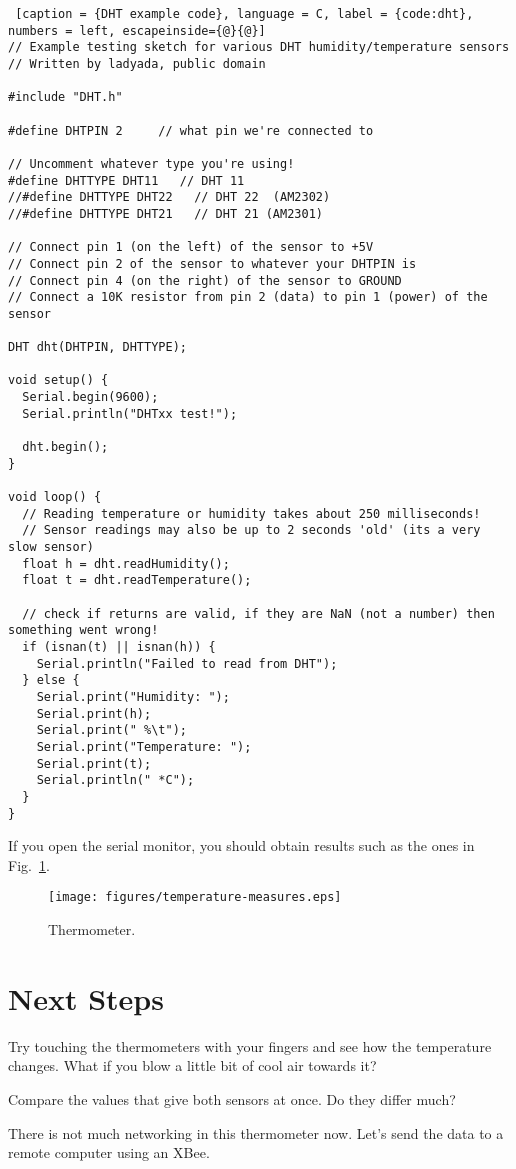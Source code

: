 \begin{lstlisting} [caption = {DHT example code}, language = C, label = {code:dht}, numbers = left, escapeinside={@}{@}]
// Example testing sketch for various DHT humidity/temperature sensors
// Written by ladyada, public domain

#include "DHT.h"

#define DHTPIN 2     // what pin we're connected to

// Uncomment whatever type you're using!
#define DHTTYPE DHT11   // DHT 11 
//#define DHTTYPE DHT22   // DHT 22  (AM2302)
//#define DHTTYPE DHT21   // DHT 21 (AM2301)

// Connect pin 1 (on the left) of the sensor to +5V
// Connect pin 2 of the sensor to whatever your DHTPIN is
// Connect pin 4 (on the right) of the sensor to GROUND
// Connect a 10K resistor from pin 2 (data) to pin 1 (power) of the sensor

DHT dht(DHTPIN, DHTTYPE);

void setup() {
  Serial.begin(9600); 
  Serial.println("DHTxx test!");
 
  dht.begin();
}

void loop() {
  // Reading temperature or humidity takes about 250 milliseconds!
  // Sensor readings may also be up to 2 seconds 'old' (its a very slow sensor)
  float h = dht.readHumidity();
  float t = dht.readTemperature();

  // check if returns are valid, if they are NaN (not a number) then something went wrong!
  if (isnan(t) || isnan(h)) {
    Serial.println("Failed to read from DHT");
  } else {
    Serial.print("Humidity: "); 
    Serial.print(h);
    Serial.print(" %\t");
    Serial.print("Temperature: "); 
    Serial.print(t);
    Serial.println(" *C");
  }
}
\end{lstlisting}

If you open the serial monitor, you should obtain results such as the ones in Fig.~\ref{fig:temperature-measures}.

\begin{figure}[htbp]
  \centering
  \texttt{[image: figures/temperature-measures.eps]}
  \caption{Thermometer.}
  \label{fig:temperature-measures}
\end{figure}


\section{Next Steps}

Try touching the thermometers with your fingers and see how the temperature changes. What if you blow a little bit of cool air towards it? 

Compare the values that give both sensors at once. Do they differ much?

There is not much networking in this thermometer now.
Let's send the data to a remote computer using an XBee.
